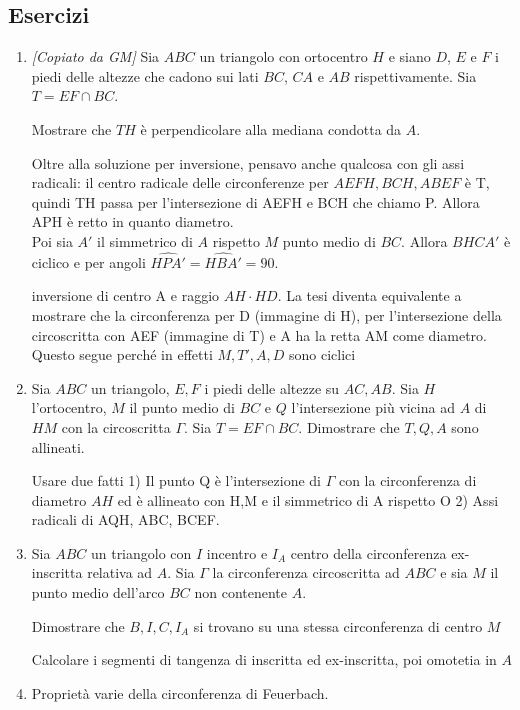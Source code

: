 \subsection{Esercizi}
\begin{enumerate}

	\item \emph{[Copiato da GM]} Sia $ABC$ un triangolo con ortocentro $H$ e siano $D$, $E$ e $F$ i piedi delle altezze che cadono sui lati $BC$, $CA$ e $AB$ rispettivamente. Sia $T=EF\cap BC$.
	
	Mostrare che $TH$ è perpendicolare alla mediana condotta da $A$.
	
	\begin{sol}Oltre alla soluzione per inversione, pensavo anche qualcosa con gli assi radicali: il centro radicale delle circonferenze per $AEFH, BCH, ABEF$ è T, quindi TH passa per l'intersezione di AEFH e BCH che chiamo P. Allora APH è retto in quanto diametro.\\
	Poi sia $A'$ il simmetrico di $A$ rispetto $M$ punto medio di $BC$. Allora $BHCA'$ è ciclico e per angoli $\widehat{HPA'}=\widehat{HBA'}=90$.

    inversione di centro A e raggio $AH\cdot HD$. La tesi diventa equivalente a mostrare che la circonferenza per D (immagine di H), per l'intersezione della circoscritta con AEF (immagine di T) e A ha la retta AM come diametro. Questo segue perché in effetti $M,T',A,D$ sono ciclici
	\end{sol}
	
	
	\item Sia $ABC$ un triangolo, $E,F$ i piedi delle altezze su $AC,AB$. Sia $H$ l'ortocentro, $M$ il punto medio di $BC$ e $Q$ l'intersezione più vicina ad $A$ di $HM$ con la circoscritta $\Gamma$. Sia $T=EF\cap BC$. Dimostrare che $T,Q,A$ sono allineati.
	
	\begin{sol} Usare due fatti 1) Il punto Q è l'intersezione di $\Gamma$ con la circonferenza di diametro $AH$ ed è allineato con H,M e il simmetrico di A rispetto O 2) Assi radicali di AQH, ABC, BCEF.
	\end{sol}	
	
	\item Sia $ABC$ un triangolo con $I$ incentro e $I_A$ centro della circonferenza ex-inscritta relativa ad $A$. Sia $\Gamma$ la circonferenza circoscritta ad $ABC$ e sia $M$ il punto medio dell'arco $BC$ non contenente $A$.
	
	Dimostrare che $B,I,C,I_A$ si trovano su una stessa circonferenza di centro $M$
	

	
\begin{sol}Calcolare i segmenti di tangenza di inscritta ed ex-inscritta, poi omotetia in $A$
 
\end{sol}

	
	\item Proprietà varie della circonferenza di Feuerbach. 
\end{enumerate}


